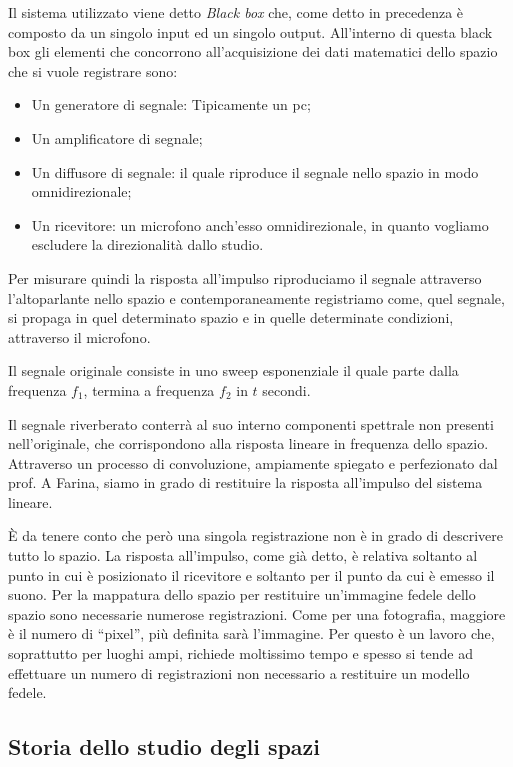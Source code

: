 Il sistema utilizzato viene detto \textit{Black box} che, come detto in precedenza è composto da un singolo input ed un singolo output. All’interno di questa black box gli elementi che concorrono all’acquisizione dei dati matematici dello spazio che si vuole registrare sono:
\begin{itemize}
\item Un generatore di segnale: Tipicamente un pc;
\item Un amplificatore di segnale;
\item Un diffusore di segnale: il quale riproduce il segnale nello spazio in modo omnidirezionale;
\item Un ricevitore: un microfono anch’esso omnidirezionale, in quanto vogliamo escludere la direzionalità dallo studio.
\end{itemize}
Per misurare quindi la risposta all'impulso riproduciamo il segnale attraverso l’altoparlante nello spazio e contemporaneamente registriamo come, quel segnale, si propaga in quel determinato spazio e in quelle determinate condizioni, attraverso il microfono.

Il segnale originale consiste in uno sweep esponenziale il quale parte dalla frequenza $f_1$, termina a frequenza $f_2$ in $t$ secondi.

Il segnale riverberato conterrà al suo interno componenti spettrale non presenti nell’originale, che corrispondono alla risposta lineare in frequenza dello spazio.
Attraverso un processo di convoluzione, ampiamente spiegato e perfezionato dal prof. A Farina, siamo in grado di restituire la risposta all'impulso del sistema lineare.

È da tenere conto che però una singola registrazione non è in grado di descrivere tutto lo spazio. La risposta all’impulso, come già detto, è relativa soltanto al punto in cui è posizionato il ricevitore e soltanto per il punto da cui è emesso il suono. Per la mappatura dello spazio per restituire un'immagine fedele dello spazio sono necessarie numerose registrazioni. Come per una fotografia, maggiore è il numero di “pixel”, più definita sarà l’immagine. Per questo è un lavoro che, soprattutto per luoghi ampi, richiede moltissimo tempo e spesso si tende ad effettuare un numero di registrazioni non necessario a restituire un modello fedele.

\subsection{Storia dello studio degli spazi}

